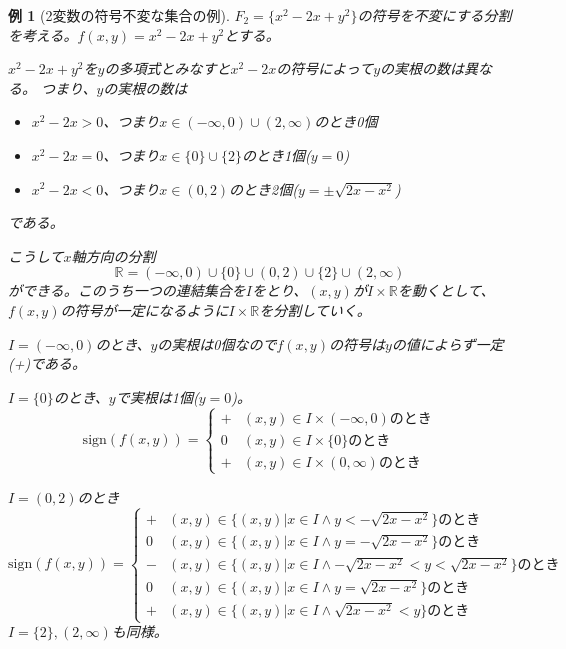 \documentclass[a4j, 12pt]{jsarticle}
\theoremstyle{break}
\newtheorem{Example}{例}[section]
\begin{document}
\begin{Example}[2変数の符号不変な集合の例]
\label{ex2}
$F_2 = \{x^2-2x+y^2\}$の符号を不変にする分割を考える。$f(x, y) = x^2 - 2x + y^2$とする。

$x^2-2x+y^2$を$y$の多項式とみなすと$x^2-2x$の符号によって$y$の実根の数は異なる。
つまり、$y$の実根の数は
\begin{itemize}
 \item $x^2-2x > 0$、つまり$x \in (-\infty, 0) \cup (2, \infty)$のとき0個
 \item $x^2-2x = 0$、つまり$x \in \{ 0 \} \cup \{ 2 \}$のとき1個($y = 0$)
 \item $x^2-2x < 0$、つまり$x \in (0,2)$のとき2個($y = \pm \sqrt{2x - x^2}$)
\end{itemize}
である。

こうして$x$軸方向の分割
\begin{equation}
\label{eq:eq1}
\mathbb{R} = (-\infty, 0) \cup \{ 0 \} \cup (0, 2) \cup \{ 2 \} \cup (2, \infty)
\end{equation}
ができる。このうち一つの連結集合を$I$をとり、$(x, y)$が$I \times \mathbb{R}$を動くとして、$f(x, y)$の符号が一定になるように$I \times \mathbb{R}$を分割していく。

$I = (-\infty, 0)$のとき、$y$の実根は0個なので$f(x,y)$の符号は$y$の値によらず一定(+)である。

$I = \{0\}$のとき、$y$で実根は1個($y=0$)。
\[
\mathrm{sign}(f(x,y))=
\begin{cases}
+ & (x, y) \in I \times (-\infty, 0)\text{のとき} \\
0 & (x, y) \in I \times \{0\}\text{のとき} \\
+ & (x, y) \in I \times (0, \infty)\text{のとき}
\end{cases}
\]

$I = (0, 2)$のとき
\[
\mathrm{sign}(f(x,y))=
\begin{cases}
+ & (x, y) \in \{(x, y) | x \in I \wedge y < -\sqrt{2x - x^2}\}\text{のとき} \\
0 & (x, y) \in \{(x, y) | x \in I \wedge y = -\sqrt{2x - x^2} \}\text{のとき} \\
- & (x, y) \in \{(x, y) | x \in I \wedge -\sqrt{2x - x^2} < y < \sqrt{2x - x^2} \}\text{のとき} \\
0 & (x, y) \in \{(x, y) | x \in I \wedge y = \sqrt{2x - x^2} \}\text{のとき} \\
+ & (x, y) \in \{(x, y) | x \in I \wedge \sqrt{2x - x^2} < y \} \text{のとき}
\end{cases}
\]
$I = \{ 2 \}, (2, \infty)$も同様。


\end{Example}
\end{document}
